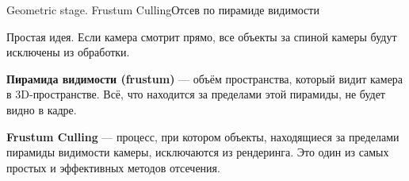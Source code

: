 \documentclass{beamer}
\begin{document}
	\begin{frame}{Geometric stage. Frustum Culling}{Отсев по пирамиде видимости}

	Простая идея. Если камера смотрит прямо, все объекты за спиной камеры будут исключены из обработки.

	\textbf{Пирамида видимости (frustum)} --- объём пространства, который видит камера в 3D-пространстве. Всё, что находится за пределами этой пирамиды, не будет видно в кадре.

	\textbf{Frustum Culling} --- процесс, при котором объекты, находящиеся за пределами пирамиды видимости камеры, исключаются из рендеринга. Это один из самых простых и эффективных методов отсечения.



	\end{frame}
\end{document}
